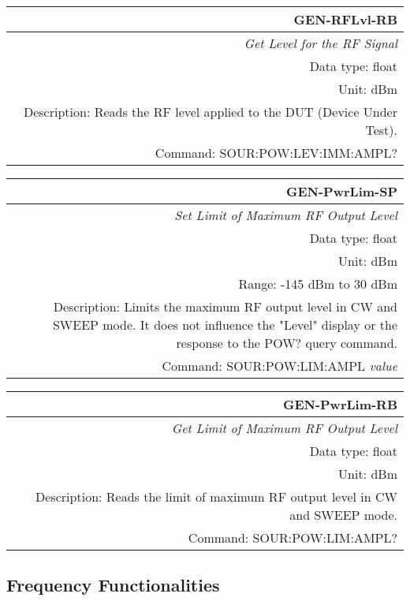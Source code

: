 \documentclass[openany]{article}
\begin{document}
		\begin{tabular}{N}
			\hline
			\bfseries GEN-RFLvl-RB \\ \hline
			\emph{Get Level for the RF Signal} \\
			Data type: float \\
			Unit: dBm \\
			Description: Reads the RF level applied to the DUT (Device Under Test). \\
			Command: SOUR:POW:LEV:IMM:AMPL? \\

		\end{tabular}
%
		\begin{tabular}{N}
			\hline
			\bfseries GEN-PwrLim-SP \\ \hline
			\emph{Set Limit of Maximum RF Output Level} \\
			Data type: float \\
			Unit: dBm \\
			Range: -145 dBm to 30 dBm \\
			Description: Limits the maximum RF output level in CW and SWEEP mode. It does not influence the "Level" display or the response to the POW? query command. \\
			Command: SOUR:POW:LIM:AMPL \emph{value} \\
			
		\end{tabular}


		\begin{tabular}{N}
			\hline
			\bfseries GEN-PwrLim-RB \\ \hline
			\emph{Get Limit of Maximum RF Output Level} \\
			Data type: float \\
			Unit: dBm \\
			Description: Reads the limit of maximum RF output level in CW and SWEEP mode. \\
			Command: SOUR:POW:LIM:AMPL? \\

		\end{tabular}
%
	\subsection{Frequency Functionalities}\label{pvgroup:function} %
\end{document}
